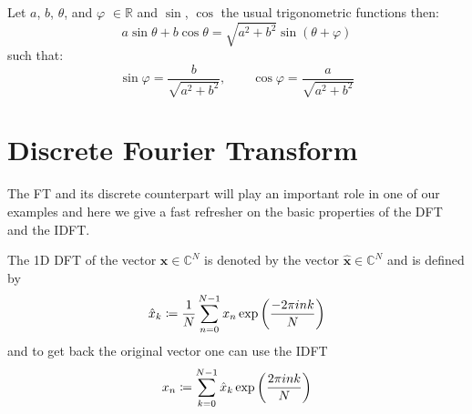 	\begin{Lem}
		Let $a$, $b$, $\theta$, and $\varphi$ $\in \mathbb{R}$ and $\sin$, $\cos$ 
        the usual trigonometric functions then:
		\begin{equation}
			a\sin \theta+b\cos \theta  = \sqrt{a^2+b^2}\sin(\theta + \varphi)
		\end{equation}
		such that:
		\begin{equation}
			\sin\varphi=\frac{b}{\sqrt{a^2+b^2}}, \qquad \cos\varphi = \frac{a}{\sqrt{a^2+b^2}}
		\end{equation}
		\end{Lem}


\section{Discrete Fourier Transform}
The \ac{FT} and its discrete counterpart will play an important role in one of our examples and here we give a fast refresher on the basic properties of the \ac{DFT} and the \ac{IDFT}.

\begin{Def}[1D \ac{DFT}]\label{def:1ddft}
    The 1D \ac{DFT}  of the vector $\boldsymbol{x} \in \mathbb{C}^{N}$ is denoted by the vector $\hat {\boldsymbol{x}} \in \mathbb{C}^{N}$ and is defined by
    \begin{equation}\label{eq:1ddft}
        {\hat x}_k \coloneqq \frac{1}{N}\sum_{n=0}^{N-1} x_n\exp\left({\frac{-2\pi ink}{N}}\right)\index{\ac{FT}!$1$-$d$ \ac{DFT}}
    \end{equation}
    and to get back the original vector one can use the \ac{IDFT} 
    \begin{equation}\label{eq:1didft}
        x_n \coloneqq \sum_{k=0}^{N-1}\hat{x}_{k}\exp\left({\frac{2\pi ink}{N}}\right)\index{\ac{FT}!$1$-$d$ \ac{IDFT}}
    \end{equation}    
\end{Def}


